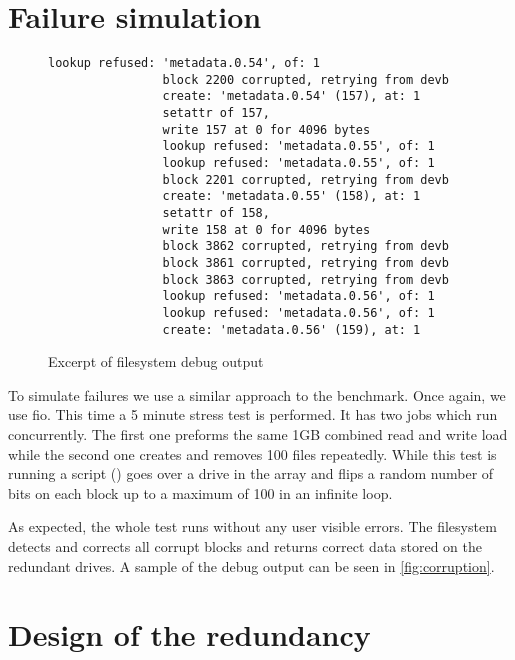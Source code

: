     \section{Failure simulation}

        \begin{wrapfigure}[17]{r}{0.55\textwidth}
            \vspace{-20pt}
            \begin{lstlisting}[gobble=16]
                lookup refused: 'metadata.0.54', of: 1
                block 2200 corrupted, retrying from devb
                create: 'metadata.0.54' (157), at: 1
                setattr of 157,
                write 157 at 0 for 4096 bytes
                lookup refused: 'metadata.0.55', of: 1
                lookup refused: 'metadata.0.55', of: 1
                block 2201 corrupted, retrying from devb
                create: 'metadata.0.55' (158), at: 1
                setattr of 158,
                write 158 at 0 for 4096 bytes
                block 3862 corrupted, retrying from devb
                block 3861 corrupted, retrying from devb
                block 3863 corrupted, retrying from devb
                lookup refused: 'metadata.0.56', of: 1
                lookup refused: 'metadata.0.56', of: 1
                create: 'metadata.0.56' (159), at: 1
            \end{lstlisting}
            \caption{Excerpt of filesystem debug output}
            \label{fig:corruption}
        \end{wrapfigure}

        To simulate failures we use a similar approach to the benchmark. Once
        again, we use fio. This time a 5 minute stress test is performed. It
        has two jobs which run concurrently. The first one preforms the same
        1GB combined read and write load while the second one creates and
        removes 100 files repeatedly. While this test is running a script
        () goes over a drive in the array
        and flips a random number of bits on each block up to a maximum of 100
        in an infinite loop.

        As expected, the whole test runs without any user visible errors. The
        filesystem detects and corrects all corrupt blocks and returns correct
        data stored on the redundant drives. A sample of the debug output can
        be seen in \autoref{fig:corruption}.

    \section{Design of the redundancy}

